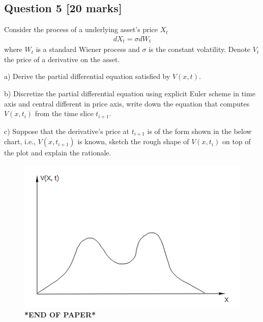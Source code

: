\documentclass[11pt,a4paper,hidelinks,fleqn]{article}            %
\begin{document}
\subsection*{Question 5 [20 marks]}
Consider the process of a underlying asset's price $X_t$
\begin{align*}
dX_t = \sigma dW_t
\end{align*}
where $W_t$ is a standard Wiener process and $\sigma$ is the constant volatility.
Denote $V_t$ the price of a derivative on the asset. 

a) Derive the partial differential equation satisfied by $V(x, t)$.

b) Discretize the partial differential equation using explicit Euler scheme in time axis and central different in price axis,
write down the equation that computes $V(x, t_i)$ from the time slice $t_{i+1}$.

c) Suppose that the derivative's price at $t_{i+1}$ is of the form shown in the below chart,
i.e., $V(x, t_{i+1})$ is known, 
sketch the rough shape of $V(x, t_{i})$ on top of the plot and explain the rationale.
\begin{figure}[h]
\includegraphics[scale=0.9]{./6c} \\
\vspace{1cm}
\textbf{*END OF PAPER*}
\end{figure}
\end{document}

